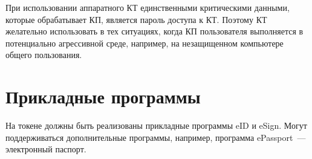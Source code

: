 При использовании аппаратного КТ единственными критическими данными, 
которые обрабатывает КП, является пароль доступа к КТ. Поэтому КТ 
желательно использовать в тех ситуациях, когда КП пользователя 
выполняется в потенциально агрессивной среде, например, 
на незащищенном компьютере общего пользования.

\section{Прикладные программы} 

На токене должны быть реализованы прикладные программы eID и eSign. Могут 
поддерживаться дополнительные  программы, например, 
программа ePassport~--- электронный паспорт. 

